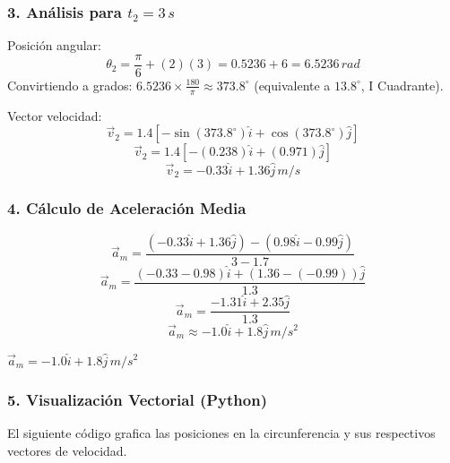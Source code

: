 \documentclass[12pt, a4paper]{article}
\begin{document}
\subsubsection*{3. Análisis para $t_2 = 3 \, \si{s}$}
Posición angular:
$$ \theta_2 = \frac{\pi}{6} + (2)(3) = 0.5236 + 6 = 6.5236 \, \si{rad} $$
Convirtiendo a grados: $6.5236 \times \frac{180}{\pi} \approx 373.8^\circ$ (equivalente a $13.8^\circ$, I Cuadrante).

Vector velocidad:
$$ \vec{v}_2 = 1.4 [-\sin(373.8^\circ)\hat{i} + \cos(373.8^\circ)\hat{j}] $$
$$ \vec{v}_2 = 1.4 [-(0.238)\hat{i} + (0.971)\hat{j}] $$
$$ \vec{v}_2 = -0.33\hat{i} + 1.36\hat{j} \, \si{m/s} $$

\subsubsection*{4. Cálculo de Aceleración Media}
$$ \vec{a}_m = \frac{(-0.33\hat{i} + 1.36\hat{j}) - (0.98\hat{i} - 0.99\hat{j})}{3 - 1.7} $$
$$ \vec{a}_m = \frac{(-0.33 - 0.98)\hat{i} + (1.36 - (-0.99))\hat{j}}{1.3} $$
$$ \vec{a}_m = \frac{-1.31\hat{i} + 2.35\hat{j}}{1.3} $$
$$ \vec{a}_m \approx -1.0\hat{i} + 1.8\hat{j} \, \si{m/s^2} $$

\begin{tcolorbox}[colback=blue!5!white, colframe=blue!75!black, title=Respuesta Final]
\centering $\vec{a}_m = -1.0\hat{i} + 1.8\hat{j} \, \si{m/s^2}$
\end{tcolorbox}

\subsubsection*{5. Visualización Vectorial (Python)}
El siguiente código grafica las posiciones en la circunferencia y sus respectivos vectores de velocidad.
\end{document}
